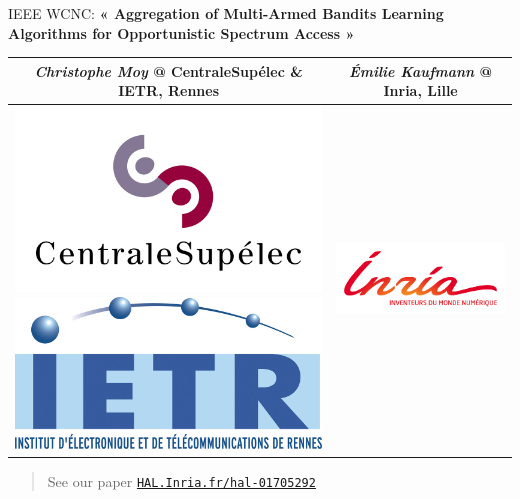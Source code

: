 \documentclass[12pt,english,ignorenonframetext,]{beamer}
\begin{document}
\begin{block}{IEEE WCNC: \textbf{« Aggregation of Multi-Armed Bandits
Learning Algorithms for Opportunistic Spectrum Access »}}
\begin{longtable}[c]{@{}cc@{}}
\toprule
\emph{Christophe Moy} @ CentraleSupélec \& IETR, Rennes & \emph{Émilie
Kaufmann} @ Inria, Lille\tabularnewline
\midrule
\endhead
\includegraphics{../common/LogoCS.png}
\includegraphics{../common/LogoIETR.png} &
\includegraphics{../common/LogoInria.jpg}\tabularnewline
\bottomrule
\end{longtable}

\begin{quote}
See our paper
\href{https://hal.inria.fr/hal-01705292}{\texttt{HAL.Inria.fr/hal-01705292}}
\end{quote}

\end{block}
\end{document}
